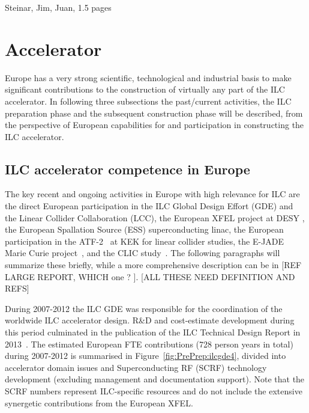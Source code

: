 \documentclass[%
 reprint,
 amsmath,amssymb,
 aps,
]{revtex4-1}
\begin{document}
Steinar, Jim, Juan, 1.5 pages

\section{\label{sec:acc}Accelerator}

Europe has a very strong scientific, technological and industrial basis
to make significant contributions to the construction of virtually any part of the ILC accelerator. 
In following three subsections the past/current activities, the ILC preparation phase and the subsequent construction phase 
will be described, from the perspective of European capabilities for and participation in constructing the ILC accelerator.   

\subsection{ILC accelerator competence in Europe~\label{sec:competence:accelerator}}

The key recent and ongoing activities in Europe with high relevance for ILC are the direct
European participation in the ILC Global Design Effort (GDE) and the Linear Collider Collaboration (LCC),
the European XFEL project at DESY , the European Spallation Source (ESS) superconducting linac, the European participation
in the ATF-2~\cite{Grishanov:2005ek,Grishanov:2006kx} at KEK for linear collider studies, the E-JADE Marie Curie project~\cite{ejade}, 
and the CLIC study~\cite{Aicheler:2012bya,Linssen:2012hp}. The following paragraphs will 
summarize these briefly, while a more comprehensive description can be in [REF LARGE REPORT, WHICH one ? ]. [ALL THESE NEED DEFINITION AND REFS]
\vspace{0.15cm}

During 2007-2012 the ILC GDE was responsible for the coordination of the worldwide ILC accelerator design. 
R\&D and cost-estimate development during this period culminated in the publication of the ILC Technical Design Report in 2013~\cite{Behnke:2013xla}. 
The estimated European FTE contributions (728 person years in total) during 2007-2012 is summarised in Figure~\ref{fig:PrePrep:ilcgde4}, 
divided into accelerator domain issues and Superconducting RF (SCRF) technology development (excluding management and documentation support). 
Note that the SCRF numbers represent ILC-specific resources and do not include the extensive synergetic contributions from the European XFEL.
\end{document}
